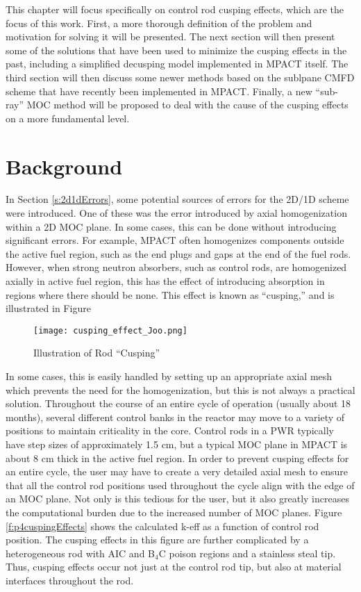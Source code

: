 This chapter will focus specifically on control rod cusping effects, which are the focus of this work.  First, a more thorough definition of the problem and motivation for solving it will be presented.  The next section will then present some of the solutions that have been used to minimize the cusping effects in the past, including a simplified decusping model implemented in MPACT itself.  The third section will then discuss some newer methods based on the sublpane CMFD scheme that have recently been implemented in MPACT.  Finally, a new ``sub-ray'' MOC method will be proposed to deal with the cause of the cusping effects on a more fundamental level.

\section{Background}

In Section \ref{s:2d1dErrors}, some potential sources of errors for the 2D/1D scheme were introduced.  One of these was the error introduced by axial homogenization within a 2D MOC plane.  In some cases, this can be done without introducing significant errors.  For example, MPACT often homogenizes components outside the active fuel region, such as the end plugs and gaps at the end of the fuel rods.  However, when strong neutron absorbers, such as control rods, are homogenized axially in active fuel region, this has the effect of introducing absorption in regions where there should be none.  This effect is known as ``cusping,'' and is illustrated in Figure 

\begin{figure}
    \centering
    \texttt{[image: cusping\_effect\_Joo.png]}
    \caption{Illustration of Rod ``Cusping'' \cite{ICAPPcontrolRodDecuspingNTRACER}}\label{f:cuspingEffectJoo}
\end{figure}

In some cases, this is easily handled by setting up an appropriate axial mesh which prevents the need for the homogenization, but this is not always a practical solution.  Throughout the course of an entire cycle of operation (usually about 18 months), several different control banks in the reactor may move to a variety of positions to maintain criticality in the core.  Control rods in a PWR typically have step sizes of approximately 1.5 cm, but a typical MOC plane in MPACT is about 8 cm thick in the active fuel region.  In order to prevent cusping effects for an entire cycle, the user may have to create a very detailed axial mesh to ensure that all the control rod positions used throughout the cycle align with the edge of an MOC plane.  Not only is this tedious for the user, but it also greatly increases the computational burden due to the increased number of MOC planes.  Figure \ref{f:p4cuspingEffects} shows the calculated k-eff as a function of control rod position.  The cusping effects in this figure are further complicated by a heterogeneous rod with AIC and B$_4$C poison regions and a stainless steal tip.  Thus, cusping effects occur not just at the control rod tip, but also at material interfaces throughout the rod.

